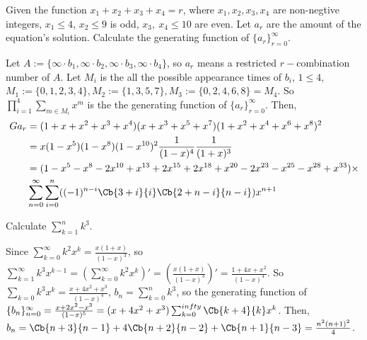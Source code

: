\documentclass{ctexart}
\newif\ifpreface
\begin{document}
\large
\setlength{\baselineskip}{1.2em}
\ifpreface
    
    \newgeometry{left=2cm,right=2cm,top=2cm,bottom=2cm}
\else
{}
\maketitle
\fi
\iffalse
\begin{problem}
    Given the function $x_1+x_2+x_3+x_4=r$, where $x_1,x_2,x_3,x_4$ are non-negtive integers, $x_1\leq 4$, $x_2\le 9$ is odd, $x_3,\ x_4\le10$ are even. Let $a_r$ are the amount of the equation's solution. Calculate the generating function of $\{a_r\}_{r=0}^{\infty}$.
\end{problem}
\begin{solution}
    Let $A:=\{\infty\cdot b_1,\infty\cdot b_2,\infty\cdot b_3,\infty\cdot b_4\}$, so $a_r$ means a restricted $r-$combination number of $A$.
    Let $M_i$ is the all the possible appearance times of $b_i$, $1\leq 4$, $M_1:=\{0,1,2,3,4\},M_2:=\{1,3,5,7\},M_3:=\{0,2,4,6,8\}=M_4$. So $\prod_{i=1}^4\sum_{m\in M_i}x^m$ is the the generating function of $\{a_r\}_{r=0}^{\infty}$. Then,
    \begin{equation}
        \begin{aligned}
            G{a_r}&=(1+x+x^2+x^3+x^4)(x+x^3+x^5+x^7)(1+x^2+x^4+x^6+x^8)^2\\
                  &=x(1-x^5)(1-x^8)(1-x^{10})^2 \frac{1}{(1-x)^4}\frac{1}{(1+x)^3}\\
                  &=(1-x^5-x^8-2x^{10}+x^{13}+2x^{15}+2x^{18}+x^{20}-2x^{23}-x^{25}-x^{28}+x^{33})\times\\
                  &\sum_{n=0}^{\infty}\sum_{i=0}^n((-1)^{n-i}\Cb{3+i}{i}\Cb{2+n-i}{n-i})x^{n+1}
        \end{aligned}
    \end{equation}
\end{solution}

\begin{problem}
    Calculate $\sum_{k=1}^{n}k^3$.
\end{problem}
\begin{solution}
    Since $\sum_{k=0}^{\infty}k^2x^k=\frac{x(1+x)}{(1-x)^3}$, so $\sum_{k=1}^{\infty}k^3x^{k-1}=\left(\sum_{k=0}^{\infty}k^2x^k\right)'=\left(\frac{x(1+x)}{(1-x)^3}\right)'=\frac{1+4x+x^2}{(1-x)^4}$. So $\sum_{k=0}k^3x^k=\frac{x+4x^2+x^3}{(1-x)^4}$, $b_n=\sum_{k=0}^nk^3$, so the generating function of $\{b_n\}_{n=0}^{\infty}=\frac{x+2x^2-x^3}{(1-x)^5}=(x+4x^2+x^3)\sum_{k=0}^{infty}\Cb{k+4}{k}x^k$. Then, $b_n=\Cb{n+3}{n-1}+4\Cb{n+2}{n-2}+\Cb{n+1}{n-3}=\frac{n^2(n+1)^2}{4}$.
\end{solution}
\end{document}
